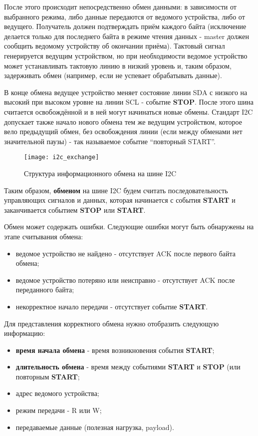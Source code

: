 После этого происходит непосредственно обмен данными: в зависимости от выбранного режима, либо данные передаются от ведомого устройства, либо от ведущего. Получатель должен подтверждать приём каждого байта (исключение делается только для последнего байта в режиме чтения данных - master должен сообщить ведомому устройству об окончании приёма). Тактовый сигнал генерируется ведущим устройством, но при необходимости ведомое устройство может устанавливать тактовую линию в низкий уровень и, таким образом, задерживать обмен (например, если не успевает обрабатывать данные).

В конце обмена ведущее устройство меняет состояние линии SDA с низкого на высокий при высоком уровне на линии SCL - событие \textbf{STOP}. После этого шина считается освобождённой и в ней могут начинаться новые обмены. Стандарт I2C допускает также начало нового обмена тем же ведущим устройством, которое вело предыдущий обмен, без освобождения линии (если между обменами нет значительной паузы) - так называемое событие ``повторный START''.

\begin{figure}[H]
 \centering
 \texttt{[image: i2c\_exchange]}
 \caption{Структура информационного обмена на шине I2C}
 \label{fig:i2c_exchange}
\end{figure}

Таким образом, \textbf{обменом} на шине I2C будем считать последовательность управляющих сигналов и данных, которая начинается с события \textbf{START} и заканчивается событием \textbf{STOP} или \textbf{START}.

Обмен может содержать ошибки. Следующие ошибки могут быть обнаружены на этапе считывания обмена:

\begin{itemize}
 \item ведомое устройство не найдено - отсутствует ACK после первого байта обмена;
 \item ведомое устройство потеряно или неисправно - отсутствует ACK после переданного байта;
 \item некорректное начало передачи - отсутствует событие \textbf{START}.
\end{itemize}


Для представления корректного обмена нужно отобразить следующую информацию:

\begin{itemize}
 \item \textbf{время начала обмена} - время возникновения события \textbf{START};
 \item \textbf{длительность обмена} - время между событиями \textbf{START} и \textbf{STOP} (или повторным \textbf{START};
 \item адрес ведомого устройства;
 \item режим передачи - R или W;
 \item передаваемые данные (полезная нагрузка, payload).
\end{itemize}
